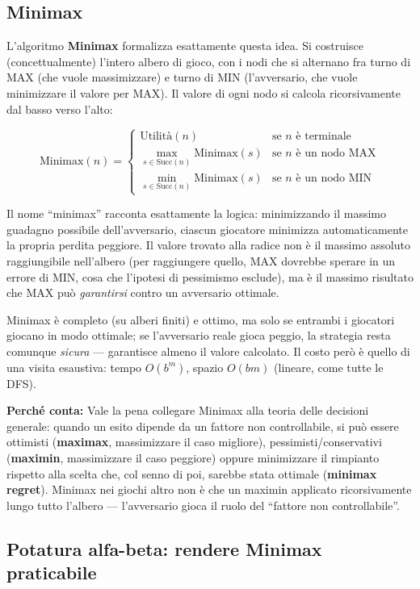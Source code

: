 \documentclass[11pt,a4paper]{article}
\newcommand{\perche}[1]{\begin{nota}\textbf{Perché conta:} #1\end{nota}}
\begin{document}
\subsection{Minimax}

L'algoritmo \textbf{Minimax} formalizza esattamente questa idea. Si costruisce (concettualmente) l'intero albero di gioco, con i nodi che si alternano fra turno di MAX (che vuole massimizzare) e turno di MIN (l'avversario, che vuole minimizzare il valore per MAX). Il valore di ogni nodo si calcola ricorsivamente dal basso verso l'alto:

\[
\text{Minimax}(n) =
\begin{cases}
\text{Utilità}(n) & \text{se } n \text{ è terminale}\\
\max_{s \in \text{Succ}(n)} \text{Minimax}(s) & \text{se } n \text{ è un nodo MAX}\\
\min_{s \in \text{Succ}(n)} \text{Minimax}(s) & \text{se } n \text{ è un nodo MIN}
\end{cases}
\]

Il nome ``minimax'' racconta esattamente la logica: minimizzando il massimo guadagno possibile dell'avversario, ciascun giocatore minimizza automaticamente la propria perdita peggiore. Il valore trovato alla radice non è il massimo assoluto raggiungibile nell'albero (per raggiungere quello, MAX dovrebbe sperare in un errore di MIN, cosa che l'ipotesi di pessimismo esclude), ma è il massimo risultato che MAX può \emph{garantirsi} contro un avversario ottimale.

Minimax è completo (su alberi finiti) e ottimo, ma solo se entrambi i giocatori giocano in modo ottimale; se l'avversario reale gioca peggio, la strategia resta comunque \emph{sicura} --- garantisce almeno il valore calcolato. Il costo però è quello di una visita esaustiva: tempo $O(b^m)$, spazio $O(bm)$ (lineare, come tutte le DFS).

\perche{Vale la pena collegare Minimax alla teoria delle decisioni generale: quando un esito dipende da un fattore non controllabile, si può essere ottimisti (\textbf{maximax}, massimizzare il caso migliore), pessimisti/conservativi (\textbf{maximin}, massimizzare il caso peggiore) oppure minimizzare il rimpianto rispetto alla scelta che, col senno di poi, sarebbe stata ottimale (\textbf{minimax regret}). Minimax nei giochi altro non è che un maximin applicato ricorsivamente lungo tutto l'albero --- l'avversario gioca il ruolo del ``fattore non controllabile''.}

\subsection{Potatura alfa-beta: rendere Minimax praticabile}
\end{document}
